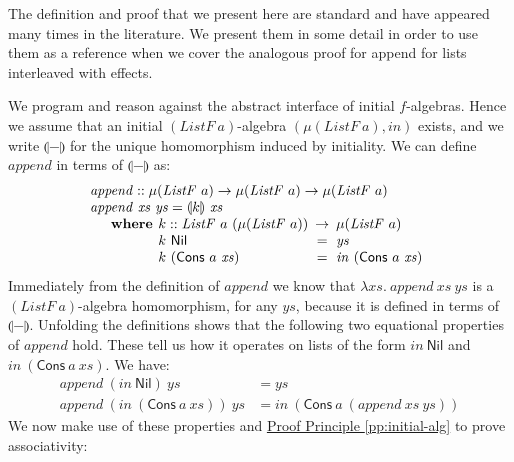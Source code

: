 \documentclass{jfp1}
\newcommand{\fold}[1]{\llparenthesis #1 \rrparenthesis}
\newcommand{\proofprinref}[1]{\hyperref[#1]{Proof Principle \ref*{#1}}}
\newcommand{\kw}[1]{\textbf{#1}}
\begin{document}
The definition and proof that we present here are standard and have
appeared many times in the literature. We present them in some detail
in order to use them as a reference when we cover the analogous proof
for append for lists interleaved with effects.

We program and reason against the abstract interface of initial
$f$-algebras. Hence we assume that an initial
$(\mathit{ListF}~a)$-algebra $(\mu(\mathit{ListF}~a), \mathit{in})$
exists, and we write $\fold{-}$ for the unique homomorphism induced by
initiality. We can define $\mathit{append}$ in terms of $\fold{-}$ as:
\begin{displaymath}
  \begin{array}{l}
    \mathit{append} :: \mu(\mathit{ListF}~a) \to \mu(\mathit{ListF}~a) \to \mu(\mathit{ListF}~a) \\
    \mathit{append}~\mathit{xs}~\mathit{ys} = \fold{k}~\mathit{xs} \\
    \quad\begin{array}{r@{\hspace{0.4em}}l@{\hspace{0.5em}}c@{\hspace{0.5em}}l}
      \kw{where} & k :: \mathit{ListF}~a~(\mu(\mathit{ListF}~a)) &\to& \mu(\mathit{ListF}~a) \\
      & k~\mathsf{Nil} &=& \mathit{ys} \\
      & k~(\mathsf{Cons}~a~\mathit{xs}) &=& \mathit{in}~(\mathsf{Cons}~a~\mathit{xs})
    \end{array}
  \end{array}
\end{displaymath}
Immediately from the definition of $\mathit{append}$ we know that
$\lambda \mathit{xs}.\ \mathit{append}~\mathit{xs}~\mathit{ys}$ is a
$(\mathit{ListF}~a)$-algebra homomorphism, for any $\mathit{ys}$,
because it is defined in terms of $\fold{-}$. Unfolding the
definitions shows that the following two equational properties of
$\mathit{append}$ hold. These tell us how it operates on lists of the
form $\mathit{in}~\mathsf{Nil}$ and
$\mathit{in}~(\mathsf{Cons}~a~\mathit{xs})$. We have:
\begin{align}
  \label{eq:append-nil}
  \mathit{append}~(\mathit{in}~\mathsf{Nil})~\mathit{ys} & = \mathit{ys} \\
  \label{eq:append-cons}
  \mathit{append}~(\mathit{in}~(\mathsf{Cons}~a~\mathit{xs}))~\mathit{ys} & = \mathit{in}~(\mathsf{Cons}~a~(\mathit{append}~\mathit{xs}~\mathit{ys}))
\end{align}
We now make use of these properties and \proofprinref{pp:initial-alg}
to prove associativity:
\end{document}
